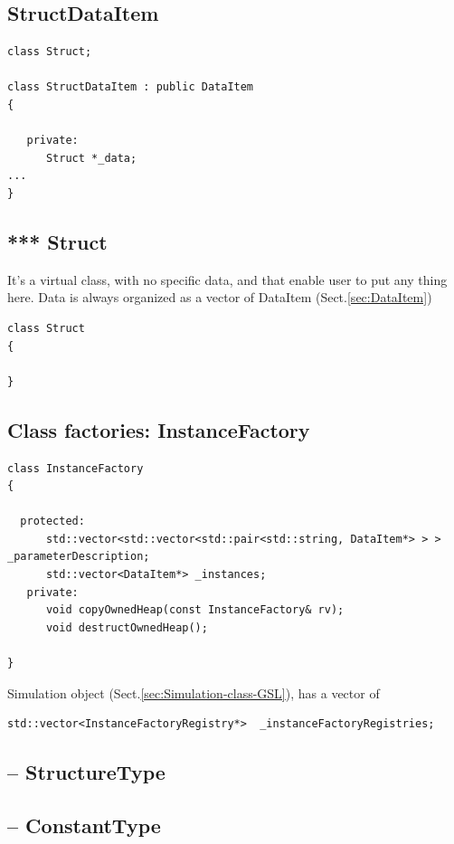 \subsection{StructDataItem}
\label{sec:StructDataItem}

\begin{lstlisting}
class Struct;

class StructDataItem : public DataItem
{

   private:
      Struct *_data;
...
}
\end{lstlisting}

\subsection{*** Struct}
\label{sec:Struct-MDL-C++}

It's a virtual class, with no specific data, and that enable user to put any
thing here. Data is always organized as a vector of DataItem
(Sect.\ref{sec:DataItem})
\begin{lstlisting}
class Struct
{

}
\end{lstlisting}
\subsection{Class factories: InstanceFactory}
\label{sec:InstanceFactory}

\begin{verbatim}
class InstanceFactory
{

  protected:
      std::vector<std::vector<std::pair<std::string, DataItem*> > > _parameterDescription;
      std::vector<DataItem*> _instances;
   private:
      void copyOwnedHeap(const InstanceFactory& rv);
      void destructOwnedHeap();

}
\end{verbatim}

Simulation object (Sect.\ref{sec:Simulation-class-GSL}), has a vector of 
\begin{verbatim}
std::vector<InstanceFactoryRegistry*>  _instanceFactoryRegistries;
\end{verbatim}


\subsection{-- StructureType}
\label{sec:StructureType}


\subsection{-- ConstantType}
\label{sec:ConstantType}

